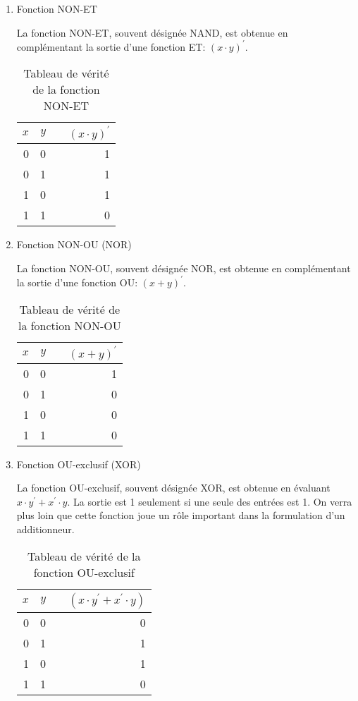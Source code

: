 \documentclass[11pt]{article}
\begin{document}
\begin{enumerate}
\item Fonction NON-ET
\label{sec:org61ea22c}

La fonction NON-ET, souvent désignée NAND, est obtenue en
complémentant la sortie d'une fonction ET: \((x \cdot y)^\prime\).

\begin{table}[htbp]
\caption{\label{tab:org0cd6f16}Tableau de vérité de la fonction NON-ET}
\centering
\begin{tabular}{rrlr}
\(x\) & \(y\) &  & \((x \cdot y)^\prime\)\\
\hline
0 & 0 &  & 1\\
0 & 1 &  & 1\\
1 & 0 &  & 1\\
1 & 1 &  & 0\\
\end{tabular}
\end{table}

\item Fonction NON-OU (NOR)
\label{sec:orge42cb03}

La fonction NON-OU, souvent désignée NOR, est obtenue en complémentant
la sortie d'une fonction OU: \((x + y)^\prime\).

\begin{table}[htbp]
\caption{\label{tab:org54b9f45}Tableau de vérité de la fonction NON-OU}
\centering
\begin{tabular}{rrlr}
\(x\) & \(y\) &  & \((x + y)^\prime\)\\
\hline
0 & 0 &  & 1\\
0 & 1 &  & 0\\
1 & 0 &  & 0\\
1 & 1 &  & 0\\
\end{tabular}
\end{table}

\item Fonction OU-exclusif (XOR)
\label{sec:org0ecd52f}

La fonction OU-exclusif, souvent désignée XOR, est obtenue en évaluant
\(x \cdot y^\prime + x^\prime \cdot y\). La sortie est 1 seulement si
une seule des entrées est 1. On verra plus loin que cette fonction
joue un rôle important dans la formulation d'un additionneur.

\begin{table}[htbp]
\caption{\label{tab:org881aff7}Tableau de vérité de la fonction OU-exclusif}
\centering
\begin{tabular}{rrlr}
\(x\) & \(y\) &  & \((x \cdot y^\prime + x^\prime \cdot y)\)\\
\hline
0 & 0 &  & 0\\
0 & 1 &  & 1\\
1 & 0 &  & 1\\
1 & 1 &  & 0\\
\end{tabular}
\end{table}
\end{enumerate}
\end{document}
